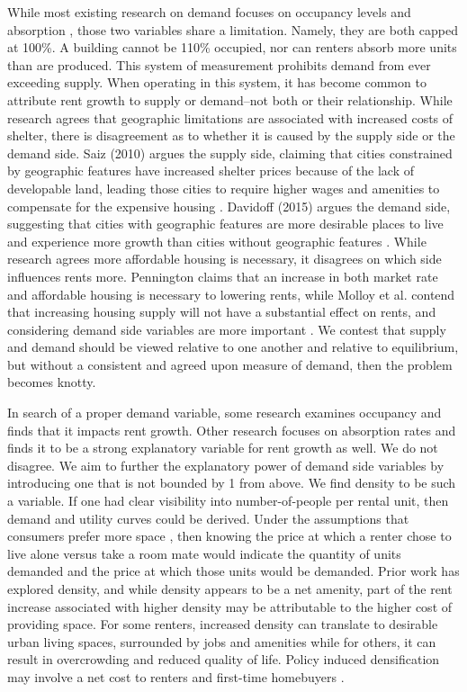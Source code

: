 \documentclass[sn-mathphys-num]{sn-jnl}%
\theoremstyle{thmstyleone}%
\theoremstyle{thmstyletwo}%
\theoremstyle{thmstylethree}%
\begin{document}
While most existing research on demand focuses on occupancy levels and absorption \cite{anenberg2024volatility} \cite{pyhrr1999real} \cite{mueller1999real}, those two variables share a limitation. Namely, they are both capped at 100\%. A building cannot be 110\% occupied, nor can renters absorb more units than are produced. This system of measurement prohibits demand from ever exceeding supply. When operating in this system, it has become common to attribute rent growth to supply or demand--not both or their relationship. While research agrees that geographic limitations are associated with increased costs of shelter, there is disagreement as to whether it is caused by the supply side or the demand side. Saiz (2010) argues the supply side, claiming that cities constrained by geographic features have increased shelter prices because of the lack of developable land, leading those cities to require higher wages and amenities to compensate for the expensive housing \cite{saiz2010geographic}. Davidoff (2015) argues the demand side, suggesting that cities with geographic features are more desirable places to live and experience more growth than cities without geographic features \cite{davidoff2015supply}. While research agrees more affordable housing is necessary, it disagrees on which side influences rents more. Pennington claims that an increase in both market rate and affordable housing is necessary to lowering rents, while Molloy et al. contend that increasing housing supply will not have a substantial effect on rents, and considering demand side variables are more important \cite{pennington2021does} \cite{molloy2022housing}. We contest that supply and demand should be viewed relative to one another and relative to equilibrium, but without a consistent and agreed upon measure of demand, then the problem becomes knotty. 

In search of a proper demand variable, some research examines occupancy \cite{gabriel2001rental} \cite{sirmans1991determinants} \cite{mueller1999real} and finds that it impacts rent growth. Other research focuses on absorption rates \cite{murray2022housing} \cite{gabriel2001rental} and finds it to be a strong explanatory variable for rent growth as well. 
We do not disagree. We aim to further the explanatory power of demand side variables by introducing one that is not bounded by 1 from above. We find density to be such a variable. If one had clear visibility into number-of-people per rental unit, then demand and utility curves could be derived. Under the assumptions that consumers prefer more space \cite{molloy2022housing}, then knowing the price at which a renter chose to live alone versus take a room mate would indicate the quantity of units demanded and the price at which those units would be demanded. Prior work has explored density, and while density appears to be a net amenity, part of the rent increase associated with higher density may be attributable to the higher cost of providing space. For some renters, increased density can translate to desirable urban living spaces, surrounded by jobs and amenities while for others, it can result in overcrowding and reduced quality of life. Policy induced densification may involve a net cost to renters and first-time homebuyers \cite{ahlfeldt2019economic} \cite{albouy2015driving}. 
  
\end{document}
